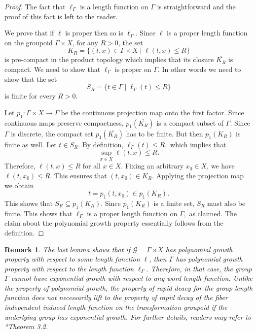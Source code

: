 \documentclass[a4paper,11pt,reqno]{amsart}
\theoremstyle{plain}
\newtheorem{rem}[thm]{Remark}
\theoremstyle{mainthmstyle}
\theoremstyle{named}
\numberwithin{equation}{section}
\begin{document}
\begin{proof}
The fact that $\ell_{\Gamma}$ is a length function on $\Gamma$ is straightforward and the proof of this fact is left to the reader.



\vspace{0.5mm}

We prove that if $\ell$ is proper then so is $\ell_{\Gamma}.$ Since $\ell$ is a proper length function on the groupoid $\Gamma \times X$, for any $R > 0$, the set 
$$K_R = \{ (t, x) \in \Gamma \times X \mid \ell(t, x) \le R \}$$
is pre-compact in the product topology which implies that its closure $\overline{K_R}$ is compact. We need to show that $\ell_{\Gamma}$ is proper on $\Gamma.$ In other words we need to show that the set 
\[ S_R = \{ t \in \Gamma \mid \ell_{\Gamma}(t) \le R \} \]
is finite for every $R > 0.$

\vspace{2mm}

Let $p_1 \colon \Gamma \times X \to \Gamma$ be the continuous projection map onto the first factor. Since continuous maps preserve compactness, $p_1(\overline{K_R})$ is a compact subset of $\Gamma$. Since $\Gamma$ is discrete, the compact set $p_1(\overline{K_R})$ has to be finite. But then $p_1(K_R)$ is finite as well.
Let $t \in S_R.$ By definition, $\ell_{\Gamma}(t) \le R,$ which implies that $$\sup_{x \in X} \ell(t, x) \le R.$$ Therefore, $\ell(t, x) \le R$ for all $x \in X$. Fixing an arbitrary $x_0 \in X$, we have $\ell(t, x_0) \le R.$ This ensures that $(t, x_0) \in K_R.$
Applying the projection map we obtain
$$t = p_1(t, x_0) \in p_1(K_R).$$
This shows that $S_R \subseteq p_1(K_R).$ Since $p_1(K_R)$ is a finite set, $S_R$ must also be finite. This shows that $\ell_{\Gamma}$ is a proper length function on $\Gamma,$ as claimed. The claim about the polynomial growth property essentially follows from the definition.
\end{proof}
\begin{rem}
    The last lemma shows that if $\mathcal{G}=\Gamma\rtimes X$ has polynomial growth property with respect to some length function $\ell$, then $\Gamma$ has polynomial growth property with respect to the length function $\ell_{\Gamma}$. Therefore, in that case, the group $\Gamma$ cannot have exponential growth with respect to any word length function. Unlike the property of polynomial growth, the property of rapid deacy for the group length function does not necessarily lift to the property of rapid decay of the fiber independent induced length function on the transformation groupoid if the underlying group has exponential growth. For further details, readers may refer to \cite{Weygandt-2024-Rapid-decay-for-etale-gpd}*{Theorem 3.2}.
\end{rem}
\end{document}
